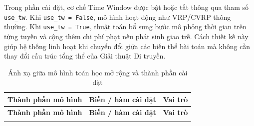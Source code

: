 \documentclass[12pt,a4paper]{article}
\numberwithin{figure}{subsection}
\numberwithin{table}{subsection}
\begin{document}
Trong phần cài đặt, cơ chế Time Window được bật hoặc tắt thông qua tham số \texttt{use\_tw}. Khi \texttt{use\_tw = False}, mô hình hoạt động như VRP/CVRP thông thường. Khi \texttt{use\_tw = True}, thuật toán bổ sung bước mô phỏng thời gian trên từng tuyến và cộng thêm chi phí phạt nếu phát sinh giao trễ. Cách thiết kế này giúp hệ thống linh hoạt khi chuyển đổi giữa các biến thể bài toán mà không cần thay đổi cấu trúc tổng thể của Giải thuật Di truyền.
\begin{center}
\footnotesize
\renewcommand{\arraystretch}{1.25}
\begin{longtable}{|>{\raggedright\arraybackslash}p{3.3cm}|>{\raggedright\arraybackslash}p{3.25cm}|>{\raggedright\arraybackslash}p{7.1cm}|}
\caption{Ánh xạ giữa mô hình toán học mở rộng và thành phần cài đặt}\label{tab:cvrp_vrptw_mapping}\\
\hline
\textbf{Thành phần mô hình} & \textbf{Biến / hàm cài đặt} & \textbf{Vai trò} \\
\hline
\endfirsthead

\hline
\textbf{Thành phần mô hình} & \textbf{Biến / hàm cài đặt} & \textbf{Vai trò} \\
\hline
\endhead

\hline
\endfoot

\hline
\endlastfoot


\end{longtable}
\end{center}
\end{document}
